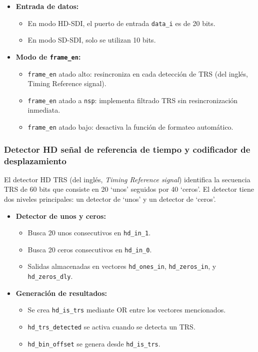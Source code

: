 \begin{itemize}
    \item \textbf{Entrada de datos:}
    \begin{itemize}
        \item En modo HD-SDI, el puerto de entrada \texttt{data\_i} es de 20 bits.
        \item En modo SD-SDI, solo se utilizan 10 bits.
    \end{itemize}
    
    \item \textbf{Modo de \texttt{frame\_en}:}
    \begin{itemize}
        \item \texttt{frame\_en} atado alto: resincroniza en cada detección de TRS  (del inglés, Timing Reference signal).
        \item \texttt{frame\_en} atado a \texttt{nsp}: implementa filtrado TRS sin resincronización inmediata.
        \item \texttt{frame\_en} atado bajo: desactiva la función de formateo automático.
    \end{itemize}
\end{itemize}

\subsubsection{Detector HD señal de referencia de tiempo y codificador de desplazamiento}

El detector HD TRS (del inglés, \textit{Timing Reference signal}) identifica la secuencia
TRS de 60 bits que consiste en 20 `unos' seguidos por 40 `ceros'. El detector tiene
dos niveles principales: un detector de `unos' y un detector de `ceros'.

\begin{itemize}
    \item \textbf{Detector de unos y ceros:}
    \begin{itemize}
        \item Busca 20 unos consecutivos en \texttt{hd\_in\_1}.
        \item Busca 20 ceros consecutivos en \texttt{hd\_in\_0}.
        \item Salidas almacenadas en vectores \texttt{hd\_ones\_in}, \texttt{hd\_zeros\_in}, y \texttt{hd\_zeros\_dly}.
    \end{itemize}
    
    \item \textbf{Generación de resultados:}
    \begin{itemize}
        \item Se crea \texttt{hd\_is\_trs} mediante OR entre los vectores mencionados.
        \item \texttt{hd\_trs\_detected} se activa cuando se detecta un TRS.
        \item \texttt{hd\_bin\_offset} se genera desde \texttt{hd\_is\_trs}.
    \end{itemize}
\end{itemize}

